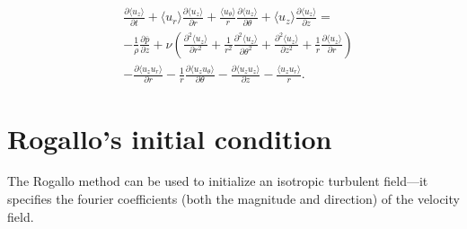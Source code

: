 \documentclass[oneside,a4paper,11pt]{report}
\newcommand{\pavg}{\overline{p}}
\begin{document}
\begin{align}
&\frac{\partial \langle u_z \rangle}{\partial t} + \langle u_r \rangle \frac{\partial \langle u_z \rangle}{\partial r} + \frac{\langle u_\theta \rangle}{r} \frac{\partial \langle u_z \rangle}{\partial \theta} + \langle u_z \rangle \frac{\partial \langle u_z \rangle}{\partial z} =  \nonumber \\
&-\frac{1}{\rho} \frac{\partial \pavg}{\partial z} + \nu \left ( \frac{\partial^2 \langle u_z \rangle}{\partial r^2} + \frac{1}{r^2} \frac{\partial^2 \langle u_z \rangle}{\partial \theta^2} + \frac{\partial^2 \langle u_z \rangle}{\partial z^2} + \frac{1}{r} \frac{\partial \langle u_z \rangle}{\partial r} \right ) \nonumber \\
&- \frac{\partial \langle u_z u_r \rangle}{\partial r} - \frac{1}{r} \frac{\partial \langle u_z u_\theta \rangle}{\partial \theta} - \frac{\partial \langle u_z u_z \rangle}{\partial z} - \frac{\langle u_z u_r \rangle}{r}.
\end{align}

\chapter{Rogallo's initial condition}
The Rogallo method \cite{rogallo1981} can be used to initialize an isotropic turbulent field---it specifies the fourier coefficients (both the magnitude and direction) of the velocity field.

\end{document}
